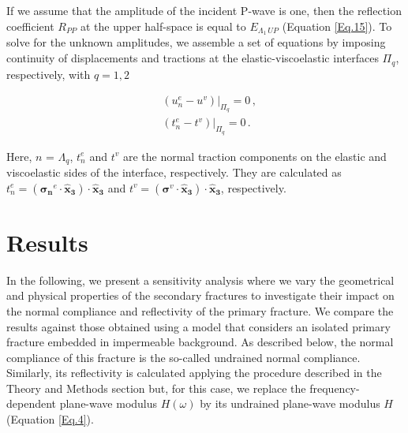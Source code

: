 \documentclass[draft]{agujournal2019}
\begin{document}
If we assume that the amplitude of the incident P-wave is one, then the reflection coefficient $R_{PP}$ at the upper half-space is equal to $E_{\Lambda_1\, UP}$ (Equation \eqref{Eq.15}). To solve for the unknown amplitudes,  we assemble a set of equations by imposing continuity of displacements and tractions at the elastic-viscoelastic interfaces $\Pi_q$, respectively, with $q=1,2$
\begin{linenomath*}
\begin{equation}\label{Eq.19}
\begin{split}
&  \left. \left(  u_n^e -  u^v \right) \right \rvert_{\Pi_q} = 0 \,, \\
&  \left. \left( t_n^e  - t^v  \right) \right \rvert_{\Pi_q} = 0 \,.
\end{split}
\end{equation}
\end{linenomath*}
Here, $n$ = $\Lambda_q$, $t_n^e$ and $t^v$ are the normal traction components on the elastic and viscoelastic sides of the interface, respectively. They are calculated as $t_n^e =( \bm{\sigma_n}^e \cdot \bm{\hat {x}_3})\cdot \bm{\hat {x}_3} $ and  
$t^v =( \bm{\sigma}^v \cdot \bm{\hat {x}_3})\cdot \bm{\hat {x}_3} $, respectively.

\section{Results}

In the following, we present a sensitivity analysis where we vary the geometrical and physical properties of the secondary fractures to investigate their impact on the normal compliance and reflectivity of the primary fracture. 
We compare the  results against those obtained using a model that considers an isolated  primary fracture embedded in impermeable background. As described below, the normal compliance of this fracture is the so-called undrained normal compliance. Similarly, its reflectivity is calculated applying the procedure described in the Theory and Methods section but, for this case, we replace the frequency-dependent plane-wave modulus $H(\omega)$ by its undrained plane-wave modulus $H$ (Equation \eqref{Eq.4}). 
\end{document}
